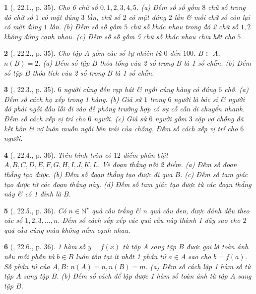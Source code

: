 \documentclass{article}
\newtheorem{baitoan}{}
\begin{document}
\begin{baitoan}[\cite{Hai_Hung_Thu_Tung_ncpt_Toan_10_tap_2}, 22.1., p. 35]
	Cho 6 chữ số $0,1,2,3,4,5$. (a) Đếm số số gồm $8$ chữ số trong đó chữ số $1$ có mặt đúng $3$ lần, chữ số $2$ có mặt đúng $2$ lần \& mỗi chữ số còn lại có mặt đúng $1$ lần. (b) Đếm số số gồm $5$ chữ số khác nhau trong đó 2 chữ số $1,2$ không đứng cạnh nhau. (c) Đếm số số gồm 5 chữ số khác nhau chia hết cho $5$.
\end{baitoan}

\begin{baitoan}[\cite{Hai_Hung_Thu_Tung_ncpt_Toan_10_tap_2}, 22.2., p. 35]
	Cho tập $A$ gồm các số tự nhiên từ $0$ đến $100$. $B\subset A$, $n(B) = 2$. (a) Đếm số tập $B$ thỏa tổng của 2 số trong $B$ là 1 số chẵn. (b) Đếm số tập $B$ thỏa tích của 2 số trong $B$ là 1 số chẵn.
\end{baitoan}

\begin{baitoan}[\cite{Hai_Hung_Thu_Tung_ncpt_Toan_10_tap_2}, 22.3., p. 35]
	$6$ người cùng đến rạp hát \& ngồi cùng hàng có đúng $6$ chỗ. (a) Đếm số cách họ xếp trong 1 hàng. (b) Giả sử $1$ trong $6$ người là bác sĩ \& người đó phải ngồi đầu lối đi vào đề phòng trường hợp có sự cố cần di chuyển nhanh. Đếm số cách xếp vị trí cho $6$ người. (c) Giả sử $6$ người gồm $3$ cặp vợ chồng đã kết hôn \& vợ luôn muốn ngồi bên trái của chồng. Đếm số cách xếp vị trí cho $6$ người.
\end{baitoan}

\begin{baitoan}[\cite{Hai_Hung_Thu_Tung_ncpt_Toan_10_tap_2}, 22.4., p. 36]
	Trên hình tròn có $12$ điểm phân biệt $A,B,C,D,E,F,G,H,I,J,K,L$. Vẽ đoạn thẳng nối 2 điểm. (a) Đếm số đoạn thẳng tạo được. (b) Đếm số đoạn thẳng tạo được đi qua $B$. (c) Đếm số tam giác tạo được từ các đoạn thẳng này. (d) Đếm số tam giác tạo được từ các đoạn thẳng này \& có 1 đỉnh là $B$.
\end{baitoan}

\begin{baitoan}[\cite{Hai_Hung_Thu_Tung_ncpt_Toan_10_tap_2}, 22.5., p. 36]
	Có $n\in\mathbb{N}^\star$ quả cầu trắng \& $n$ quả cầu đen, được đánh dấu theo các số $1,2,3,\ldots,n$. Đếm số cách sắp xếp các quả cầu này thành 1 dãy sao cho $2$ quả cầu cùng màu không nằm cạnh nhau.
\end{baitoan}

\begin{baitoan}[\cite{Hai_Hung_Thu_Tung_ncpt_Toan_10_tap_2}, 22.6., p. 36]
	1 hàm số $y = f(x)$ từ tập $A$ sang tập $B$ được gọi là {\rm toàn ánh} nếu mỗi phần tử $b\in B$ luôn tồn tại ít nhất 1 phần tử $a\in A$ sao cho $b = f(a)$. Số phần tử của $A,B$: $n(A) = n,n(B) = m$. (a) Đếm số cách lập 1 hàm số từ tập $A$ sang tập $B$. (b) Đếm số cách để lập được 1 hàm số toàn ánh từ tập $A$ sang tập $B$.
\end{baitoan}
\end{document}
